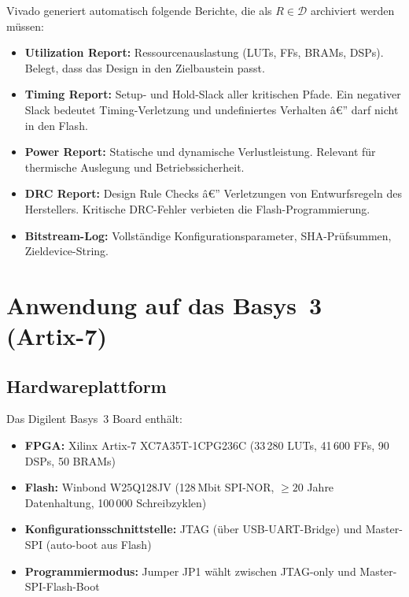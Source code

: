 ﻿\documentclass[a4paper,12pt]{article}
\theoremstyle{definition}
\begin{document}
Vivado generiert automatisch folgende Berichte, die als $R \in \mathcal{D}$
archiviert werden müssen:

\begin{itemize}
    \item \textbf{Utilization Report:} Ressourcenauslastung (LUTs, FFs,
          BRAMs, DSPs). Belegt, dass das Design in den Zielbaustein passt.
    \item \textbf{Timing Report:} Setup- und Hold-Slack aller kritischen
          Pfade. Ein negativer Slack bedeutet Timing-Verletzung und
          undefiniertes Verhalten â€” darf nicht in den Flash.
    \item \textbf{Power Report:} Statische und dynamische Verlustleistung.
          Relevant für thermische Auslegung und Betriebssicherheit.
    \item \textbf{DRC Report:} Design Rule Checks â€” Verletzungen von
          Entwurfsregeln des Herstellers. Kritische DRC-Fehler verbieten
          die Flash-Programmierung.
    \item \textbf{Bitstream-Log:} Vollständige Konfigurationsparameter,
          SHA-Prüfsummen, Zieldevice-String.
\end{itemize}

\section{Anwendung auf das Basys~3 (Artix-7)}
\label{sec:basys3}

\subsection{Hardwareplattform}

Das Digilent Basys~3 Board enthält:
\begin{itemize}
    \item \textbf{FPGA:} Xilinx Artix-7 XC7A35T-1CPG236C
          (33\,280 LUTs, 41\,600 FFs, 90 DSPs, 50 BRAMs)
    \item \textbf{Flash:} Winbond W25Q128JV (128\,Mbit SPI-NOR,
          $\geq 20$ Jahre Datenhaltung, 100\,000 Schreibzyklen)
    \item \textbf{Konfigurationsschnittstelle:} JTAG (über USB-UART-Bridge)
          und Master-SPI (auto-boot aus Flash)
    \item \textbf{Programmiermodus:} Jumper JP1 wählt zwischen
          JTAG-only und Master-SPI-Flash-Boot
\end{itemize}
\end{document}
